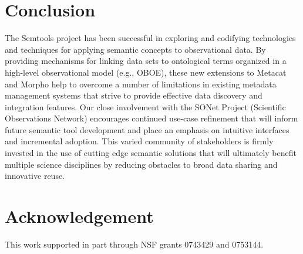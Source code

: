 \section{Conclusion}
\label{sec:summary}

The Semtools project has been successful in exploring and codifying
technologies and techniques for applying semantic concepts to
observational data. By providing mechanisms for linking data sets to
ontological terms organized in a high-level observational model (e.g.,
OBOE), these new extensions to Metacat and Morpho help to overcome a
number of limitations in existing metadata management systems that
strive to provide effective data discovery and integration
features. Our close involvement with the SONet Project (Scientific
Observations Network) \cite{sonet} encourages continued use-case
refinement that will inform future semantic tool development and place
an emphasis on intuitive interfaces and incremental adoption. This
varied community of stakeholders is firmly invested in the use of
cutting edge semantic solutions that will ultimately benefit multiple
science disciplines by reducing obstacles to broad data sharing and
innovative reuse.

\section*{Acknowledgement}

This work supported in part through NSF grants 0743429 and 0753144.


